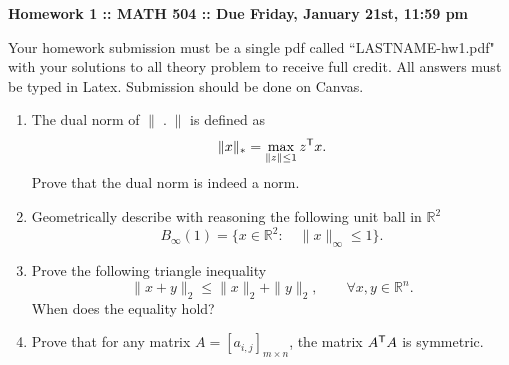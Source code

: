 \documentclass[12pt]{article}
\newcommand{\tr}{^{\sf T}}
\begin{document}
\vspace{.2 cm}

\begin{center}
{ \bf Homework 1 :: MATH 504 ::  Due Friday, January 21st, 11:59 pm} \\[.2in]
\end{center}
Your homework submission must be a single pdf called ``LASTNAME-hw1.pdf" 
with your solutions to all theory problem to receive full credit. All answers must be typed in Latex.
Submission should be done on Canvas.


\begin{enumerate}


\item The dual norm of $\|\;.\; \|$ is defined as 
\[
\|x\|_*=\max_{\|z\|\le 1} z\tr x.
\]
Prove that the dual norm is indeed a norm.

\item Geometrically describe with reasoning the following unit ball in $\mathbb R^2$
\[
B_{\infty}(1)=\{x\in\mathbb R^2: \quad \|x\|_{\infty}\le 1\}.
\]

%
\item Prove the following triangle inequality 
\[
\|x+y\|_2\le \|x\|_2+\|y\|_2,\quad\quad \forall x,y\in\mathbb R^n.
\]
When does the equality hold?
%
\item Prove that for any matrix $A=[a_{i,j}]_{m\times n}$, the matrix $A\tr A$ is symmetric.  

 
%
\end{enumerate}
\end{document}
